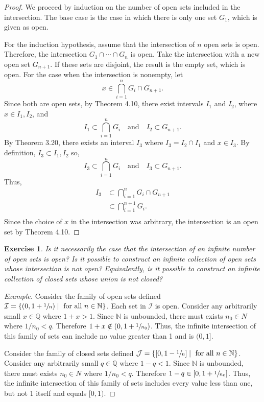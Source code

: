 \documentclass{amsart}
\newtheorem{exercise}[theorem]{Exercise}
\newcommand{\N}{\mathbb N}
\newcommand{\Q}{\mathbb Q}
\newcommand{\1}{\mathds{1}}
\def \N {{\mathbb {N}}}
\numberwithin{equation}{section}
\numberwithin{theorem}{section}
\begin{document}
\begin{proof}
	We proceed by induction on the number of open sets included in the intersection. The base case is the case in which there is only one set $G_1$, which is given as open.
	
	For the induction hypothesis, assume that the intersection of $n$ open sets is open. Therefore, the intersection $G_1 \cap \dotsm \cap G_n$ is open. Take the intersection with a new open set $G_{n+1}$. If these sets are disjoint, the result is the empty set, which is open. For the case when the intersection is nonempty, let $$x\in \bigcap_{i=1}^n G_i \cap G_{n+1}.$$ Since both are open sets, by Theorem 4.10, there exist intervals $I_1$ and $I_2$, where $x\in I_1,I_2$, and $$I_1 \subset \bigcap_{i=1}^n G_i \quad \text {and} \quad I_2 \subset G_{n+1}.$$ By Theorem 3.20, there exists an interval $I_3$ where $I_3 = I_2 \cap I_1$ and $x\in I_3$. By definition, $I_3\subset I_1,I_2$ so, $$I_3 \subset \bigcap_{i=1}^n G_i \quad \text {and} \quad I_3 \subset G_{n+1}.$$ Thus, 
	\[\begin{split}
	I_3 &\subset \bigcap_{i=1}^n G_i \cap G_{n+1}\\
		&\subset \bigcap_{i=1}^{n+1} G_i.\\
	\end{split}\]
	Since the choice of $x$ in the intersection was arbitrary, the intersection is an open set by Theorem 4.10.
\end{proof}


\begin{exercise}  Is it necessarily the case that the intersection of an infinite number of open sets is open? Is it possible to construct an infinite collection of open sets whose intersection is not open?  Equivalently, is it possible to construct an infinite collection of closed sets whose union is not closed?
\end{exercise} 

\begin{proof}[Example]
	Consider the family of open sets defined $\mathcal{I} = \{(0,1 + \sfrac{1}{n})\mid \text{ for all } n\in\N\}$. Each set in $\mathcal{I}$ is open. Consider any arbitrarily small $x\in \Q$ where $1+x> 1$. Since $\N$ is unbounded, there must exists $n_0\in N$ where $1/n_0 < q$. Therefore $1+x \notin (0,1 + \sfrac{1}{n_0})$. Thus, the infinite intersection of this family of sets can include no value greater than 1 and is $(0,1]$.
	
	Consider the family of closed sets defined $\mathcal{J} = \{[0,1 - \sfrac{1}{n}]\mid \text{ for all } n\in\N\}$. Consider any arbitrarily small $q\in \Q$ where $1-q< 1$. Since $\N$ is unbounded, there must exists $n_0\in N$ where $1/n_0 < q$. Therefore $1-q \in [0,1 + \sfrac{1}{n_0}]$. Thus, the infinite intersection of this family of sets includes every value less than one, but not 1 itself and equals $[0,1)$.
\end{proof}
\end{document}
